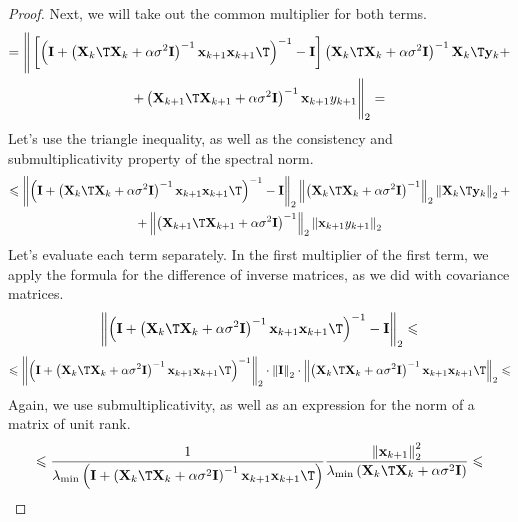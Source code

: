 \documentclass[runningheads]{llncs}
\begin{document}
\begin{proof}
Next, we will take out the common multiplier for both terms.
    \begin{multline*}
        = \Bigg\| \left[ \left( \mathbf{I} + \left( \mathbf{X}_k\T \mathbf{X}_k + \alpha \sigma^2 \mathbf{I} \right)^{-1} \mathbf{x}_{k+1} \mathbf{x}_{k+1}\T \right)^{-1} - \mathbf{I} \right] \left( \mathbf{X}_k\T \mathbf{X}_k + \alpha \sigma^2 \mathbf{I} \right)^{-1} \mathbf{X}_k\T \mathbf{y}_k + \\ + \left( \mathbf{X}_{k+1}\T \mathbf{X}_{k+1} + \alpha \sigma^2 \mathbf{I} \right)^{-1} \mathbf{x}_{k+1} y_{k+1} \Bigg\|_2 =
    \end{multline*}
    Let's use the triangle inequality, as well as the consistency and submultiplicativity property of the spectral norm.
    \begin{multline*}
        \leqslant \left\| \left( \mathbf{I} + \left( \mathbf{X}_k\T \mathbf{X}_k + \alpha \sigma^2 \mathbf{I} \right)^{-1} \mathbf{x}_{k+1} \mathbf{x}_{k+1}\T \right)^{-1} - \mathbf{I} \right\|_2 \left\| \left( \mathbf{X}_k\T \mathbf{X}_k + \alpha \sigma^2 \mathbf{I} \right)^{-1} \right\|_2 \left\| \mathbf{X}_k\T \mathbf{y}_k \right\|_2 + \\ + \left\| \left( \mathbf{X}_{k+1}\T \mathbf{X}_{k+1} + \alpha \sigma^2 \mathbf{I} \right)^{-1} \right\|_2 \left\| \mathbf{x}_{k+1} y_{k+1} \right\|_2
    \end{multline*}
    Let's evaluate each term separately. In the first multiplier of the first term, we apply the formula for the difference of inverse matrices, as we did with covariance matrices.
    \[ \left\| \left( \mathbf{I} + \left( \mathbf{X}_k\T \mathbf{X}_k + \alpha \sigma^2 \mathbf{I} \right)^{-1} \mathbf{x}_{k+1} \mathbf{x}_{k+1}\T \right)^{-1} - \mathbf{I} \right\|_2 \leqslant \]
    \[ \leqslant \left\| \left( \mathbf{I} + \left( \mathbf{X}_k\T \mathbf{X}_k + \alpha \sigma^2 \mathbf{I} \right)^{-1} \mathbf{x}_{k+1} \mathbf{x}_{k+1}\T \right)^{-1} \right\|_2 \cdot \left\| \mathbf{I} \right\|_2 \cdot \left\| \left( \mathbf{X}_k\T \mathbf{X}_k + \alpha \sigma^2 \mathbf{I} \right)^{-1} \mathbf{x}_{k+1} \mathbf{x}_{k+1}\T \right\|_2 \leqslant \]
    Again, we use submultiplicativity, as well as an expression for the norm of a matrix of unit rank.
    \[ \leqslant \dfrac{1}{\lambda_{\min}\left( \mathbf{I} + \left( \mathbf{X}_k\T \mathbf{X}_k + \alpha \sigma^2 \mathbf{I} \right)^{-1} \mathbf{x}_{k+1} \mathbf{x}_{k+1}\T \right)} \dfrac{\left\| \mathbf{x}_{k+1} \right\|_2^2}{\lambda_{\min}\left( \mathbf{X}_k\T \mathbf{X}_k + \alpha \sigma^2 \mathbf{I} \right)} \leqslant \]

\end{proof}
\end{document}
